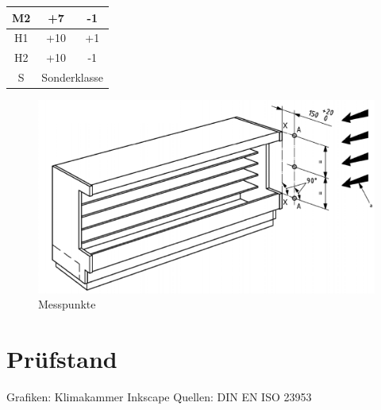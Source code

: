 \begin{table}[]
\begin{tabular}{|c|c|c|}
M2              & +7                                                                                                                         & -1                                                                                                                         \\ \hline
H1              & +10                                                                                                                        & +1                                                                                                                         \\ \hline
H2              & +10                                                                                                                        & -1                                                                                                                         \\ \hline
S               & \multicolumn{2}{c|}{Sonderklasse}                                                                                                                                                                                                                       \\ \hline
\end{tabular}
\end{table}



\begin{figure}[htb]
\centering
\includegraphics[scale=.5]{Pictures/idc_meas.pdf}
\caption{Messpunkte~\cite{DINDeutschesInstitutfurNormunge.V..}}
\label{fig:Messpunkte}
\end{figure}







\chapter{Prüfstand}
\label{cha:Prüfstand}






Grafiken:
Klimakammer Inkscape
Quellen:
DIN EN ISO 23953